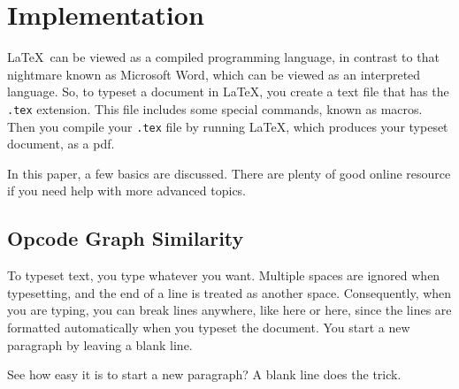 \chapter{Implementation}

\LaTeX\ can be viewed
as a compiled programming language, in contrast to that 
nightmare known as Microsoft Word,
which can be viewed as an interpreted language. So, to typeset a
document in \LaTeX, you create a text file that has the {\tt .tex} extension.
This file includes some special
commands, known as macros. Then
you compile your {\tt .tex} file by running  \LaTeX,
which produces your typeset document, as a pdf. 

In this paper, a few basics are discussed. There are plenty of good online resource
if you need help with more advanced topics.


\section{Opcode Graph Similarity} 

To typeset text, you type whatever you want. Multiple spaces are
ignored                           when typesetting, and
the end of a line is treated as another space.
Consequently, when you are typing, you can break lines anywhere, like here
or here,
since the lines are formatted automatically when you typeset the document.
You start a new paragraph by leaving a blank line.

See how easy it is to start a new paragraph? A blank line does the trick.


